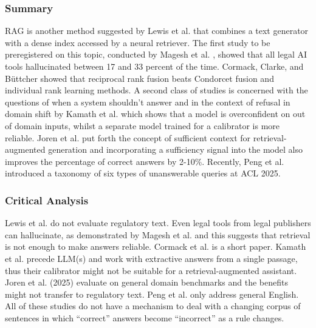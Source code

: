 \documentclass{FastFyp}
\begin{document}
\subsubsection{Summary}
RAG is another method suggested by Lewis et al. \cite{ref:lewis2020rag} that combines a text generator with a dense index accessed by a neural retriever. The first study to be preregistered on this topic, conducted by Magesh et al. \cite{ref:magesh2025}, showed that all legal AI tools hallucinated between 17 and 33 percent of the time. Cormack, Clarke, and B{\"u}ttcher \cite{ref:cormack2009rrf} showed that reciprocal rank fusion beats Condorcet fusion and individual rank learning methods. A second class of studies is concerned with the questions of when a system shouldn't answer and in the context of refusal in domain shift by Kamath et al. \cite{ref:kamath2020selective} which shows that a model is overconfident on out of domain inputs, whilst a separate model trained for a calibrator is more reliable. Joren et al. \cite{ref:joren2025sufficient} put forth the concept of sufficient context for retrieval-augmented generation and incorporating a sufficiency signal into the model also improves the percentage of correct answers by 2-10\%. Recently, Peng et al. \cite{ref:peng2025unanswerability} introduced a taxonomy of six types of unanswerable queries at ACL 2025.  

\subsubsection{Critical Analysis}
Lewis et al. \cite{ref:lewis2020rag} do not evaluate regulatory text. Even legal tools from legal publishers can hallucinate, as demonstrated by Magesh et al. \cite{ref:magesh2025} and this suggests that retrieval is not enough to make answers reliable. Cormack et al. \cite{ref:cormack2009rrf} is a short paper. Kamath et al. \cite{ref:kamath2020selective} precede LLM(s) and work with extractive answers from a single passage, thus their calibrator might not be suitable for a retrieval-augmented assistant. Joren et al. (2025) evaluate on general domain benchmarks and the benefits might not transfer to regulatory text. Peng et al. \cite{ref:peng2025unanswerability} only address general English. All of these studies do not have a mechanism to deal with a changing corpus of sentences in which “correct” answers become “incorrect” as a rule changes.
\end{document}
